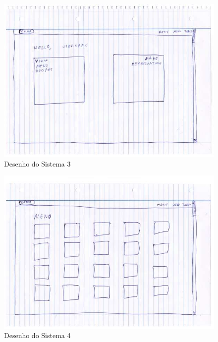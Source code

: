 \begin{figure}[!hbt]
    \centering
    \includegraphics[width=14cm]{Resources/Previous/image-092.jpg}
    \caption{Desenho do Sistema 3}
    
\end{figure}
\FloatBarrier
\begin{figure}[!hbt]
    \centering
    \includegraphics[width=14cm]{Resources/Previous/image-093.jpg}
    \caption{Desenho do Sistema 4}
    
\end{figure}
\FloatBarrier
